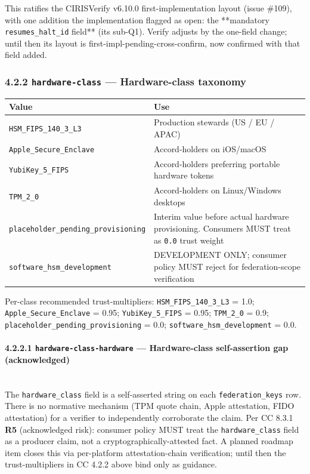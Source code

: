\documentclass[11pt]{article}
\begin{document}
This ratifies the CIRISVerify v6.10.0 first-implementation layout (issue \#109), with one addition the implementation flagged as open: the **mandatory \texttt{resumes\_halt\_id} field** (its sub-Q1). Verify adjusts by the one-field change; until then its layout is first-impl-pending-cross-confirm, now confirmed with that field added.


\subsubsection*{4.2.2 \texttt{hardware-class} — Hardware-class taxonomy}


{\footnotesize
\begin{longtable}{|p{8.0cm}|p{8.0cm}|}\hline
\textbf{Value} & \textbf{Use} \\ \hline\endhead
\texttt{HSM\_FIPS\_140\_3\_L3} & Production stewards (US / EU / APAC) \\ \hline
\texttt{Apple\_Secure\_Enclave} & Accord-holders on iOS/macOS \\ \hline
\texttt{YubiKey\_5\_FIPS} & Accord-holders preferring portable hardware tokens \\ \hline
\texttt{TPM\_2\_0} & Accord-holders on Linux/Windows desktops \\ \hline
\texttt{placeholder\_pending\_provisioning} & Interim value before actual hardware provisioning. Consumers MUST treat as \texttt{0.0} trust weight \\ \hline
\texttt{software\_hsm\_development} & DEVELOPMENT ONLY; consumer policy MUST reject for federation-scope verification \\ \hline
\end{longtable}}


Per-class recommended trust-multipliers: \texttt{HSM\_FIPS\_140\_3\_L3} = 1.0; \texttt{Apple\_Secure\_Enclave} = 0.95; \texttt{YubiKey\_5\_FIPS} = 0.95; \texttt{TPM\_2\_0} = 0.9; \texttt{placeholder\_pending\_provisioning} = 0.0; \texttt{software\_hsm\_development} = 0.0.


\paragraph{4.2.2.1 \texttt{hardware-class-hardware} — Hardware-class self-assertion gap (acknowledged)}\mbox{}\\


The \texttt{hardware\_class} field is a self-asserted string on each \texttt{federation\_keys} row. There is no normative mechanism (TPM quote chain, Apple attestation, FIDO attestation) for a verifier to independently corroborate the claim. Per CC 8.3.1 \textbf{R5} (acknowledged risk): consumer policy MUST treat the \texttt{hardware\_class} field as a producer claim, not a cryptographically-attested fact. A planned roadmap item closes this via per-platform attestation-chain verification; until then the trust-multipliers in CC 4.2.2 above bind only as guidance.
\end{document}
